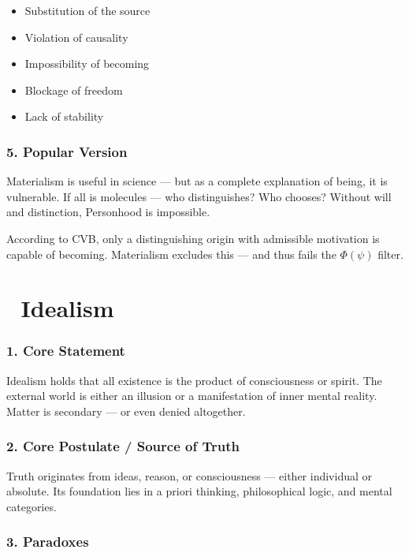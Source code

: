 \documentclass[12pt]{article}
\begin{document}
\begin{itemize}
\item Substitution of the source
\item Violation of causality
\item Impossibility of becoming
\item Blockage of freedom
\item Lack of stability
\end{itemize}

\subsubsection*{5. Popular Version}

Materialism is useful in science — but as a complete explanation of being, it is vulnerable. If all is molecules — who distinguishes? Who chooses? Without will and distinction, Personhood is impossible.

According to CVB, only a distinguishing origin with admissible motivation is capable of becoming. Materialism excludes this — and thus fails the $\Phi(\psi)$ filter.

\section*{🔷 Idealism}

\subsubsection*{1. Core Statement}

Idealism holds that all existence is the product of consciousness or spirit. The external world is either an illusion or a manifestation of inner mental reality. Matter is secondary — or even denied altogether.

\subsubsection*{2. Core Postulate / Source of Truth}

Truth originates from ideas, reason, or consciousness — either individual or absolute. Its foundation lies in a priori thinking, philosophical logic, and mental categories.

\subsubsection*{3. Paradoxes}
\end{document}
